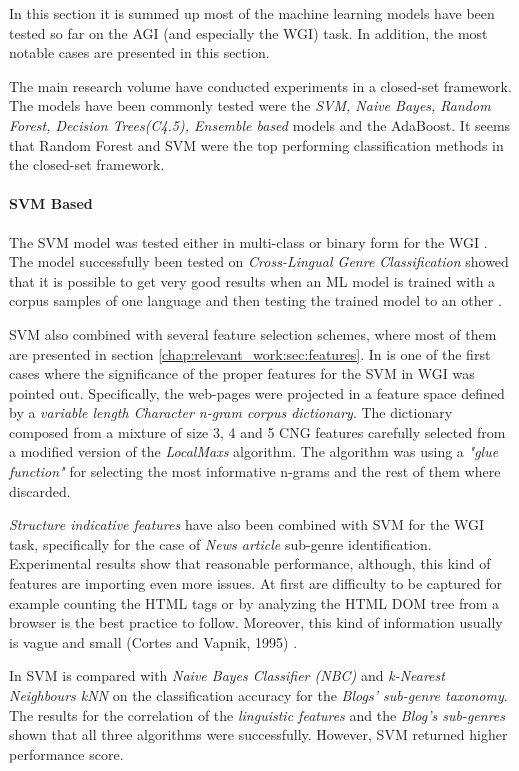 In this section it is summed up most of the machine learning models have been tested so far on the AGI (and especially the WGI) task. In addition, the most notable cases are presented in this section.

The main research volume have conducted experiments in a closed-set framework. The models have been commonly tested were the \textit{SVM, Naive Bayes, Random Forest, Decision Trees(C4.5), Ensemble based} models and the AdaBoost\parencite{lee2017text}. It seems that Random Forest and SVM were the top performing classification methods in the closed-set framework.

\paragraph{SVM Based} The SVM model was tested either in multi-class or binary form for the WGI \parencite{dai2018fine}. The model successfully been tested on \textit{Cross-Lingual Genre Classification} showed that it is possible to get very good results when an ML model is trained with a corpus samples of one language and then testing the trained model to an other \parencite{nguyen2019cross}. 

SVM also combined with several feature selection schemes, where most of them are presented in section \ref{chap:relevant_work:sec:features}. In \parencite{kanaris2009learning} is one of the first cases where the significance of the proper features for the SVM in WGI was pointed out. Specifically, the web-pages were projected in a feature space defined by a \textit{variable length Character n-gram corpus dictionary}. The dictionary composed from a mixture of size 3, 4 and 5 CNG features carefully selected from a modified version of the \textit{LocalMaxs }algorithm. The algorithm was using a \textit{"glue function"} for selecting the most informative n-grams and the rest of them where discarded.

\textit{Structure indicative features} have also been combined with SVM for the WGI task, specifically for the case of \textit{News article} sub-genre identification. Experimental results show that reasonable performance, although, this kind of features are importing even more issues. At first are difficulty to be captured for example counting the HTML tags or by analyzing the HTML DOM tree from a browser is the best practice to follow. Moreover, this kind of information usually is vague and small (Cortes and Vapnik, 1995) .

In \parencite{virik2017blog} SVM is compared with \textit{Naive Bayes Classifier (NBC)} and \textit{k-Nearest Neighbours kNN} on the classification accuracy for the \textit{Blogs' sub-genre taxonomy}. The results for the correlation of the \textit{linguistic features} and the \textit{Blog's sub-genres} shown that all three algorithms were successfully. However, SVM returned higher performance score. 

